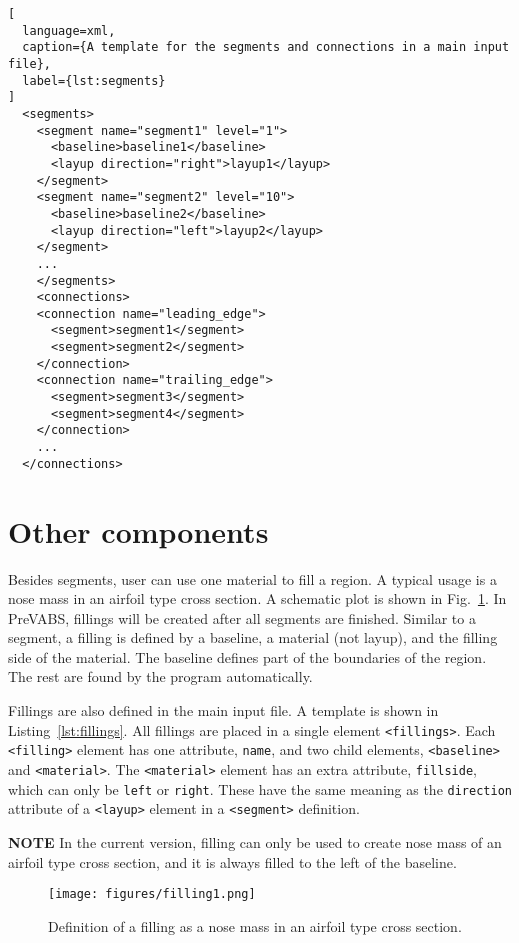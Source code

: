 \documentclass{book}
\begin{document}
\begin{lstlisting}[
  language=xml,
  caption={A template for the segments and connections in a main input file},
  label={lst:segments}
]
  <segments>
    <segment name="segment1" level="1">
      <baseline>baseline1</baseline>
      <layup direction="right">layup1</layup>
    </segment>
    <segment name="segment2" level="10">
      <baseline>baseline2</baseline>
      <layup direction="left">layup2</layup>
    </segment>
    ...
    </segments>
    <connections>
    <connection name="leading_edge">
      <segment>segment1</segment>
      <segment>segment2</segment>
    </connection>
    <connection name="trailing_edge">
      <segment>segment3</segment>
      <segment>segment4</segment>
    </connection>
    ...
  </connections>
\end{lstlisting}


\section{Other components}
\label{sec:other}

Besides segments, user can use one material to fill a region. A typical 
usage is a nose mass in an airfoil type cross section. A schematic plot 
is shown in Fig.~\ref{fig:filling1}. In PreVABS, fillings will be created 
after all segments are finished. Similar to a segment, a filling is defined 
by a baseline, a material (not layup), and the filling side of the material. 
The baseline defines part of the boundaries of the region. The rest are 
found by the program automatically.

Fillings are also defined in the main input file. A template is shown 
in Listing~\ref{lst:fillings}. All fillings are placed in a single element 
\lstinline{<fillings>}. Each \lstinline{<filling>} element has one attribute, 
\lstinline{name}, and two child elements, \lstinline{<baseline>} and 
\lstinline{<material>}. The \lstinline{<material>} element has an extra 
attribute, \lstinline{fillside}, which can only be \lstinline{left} or 
\lstinline{right}. These have the same meaning as the \lstinline{direction} 
attribute of a \lstinline{<layup>} element in a \lstinline{<segment>} definition.

\textbf{NOTE} In the current version, filling can only be used to create 
nose mass of an airfoil type cross section, and it is always filled to 
the left of the baseline.

\begin{figure}
  \centerline{\texttt{[image: figures/filling1.png]}}
  \caption{Definition of a filling as a nose mass in an airfoil type cross section.}
  \label{fig:filling1}
\end{figure}
\end{document}
